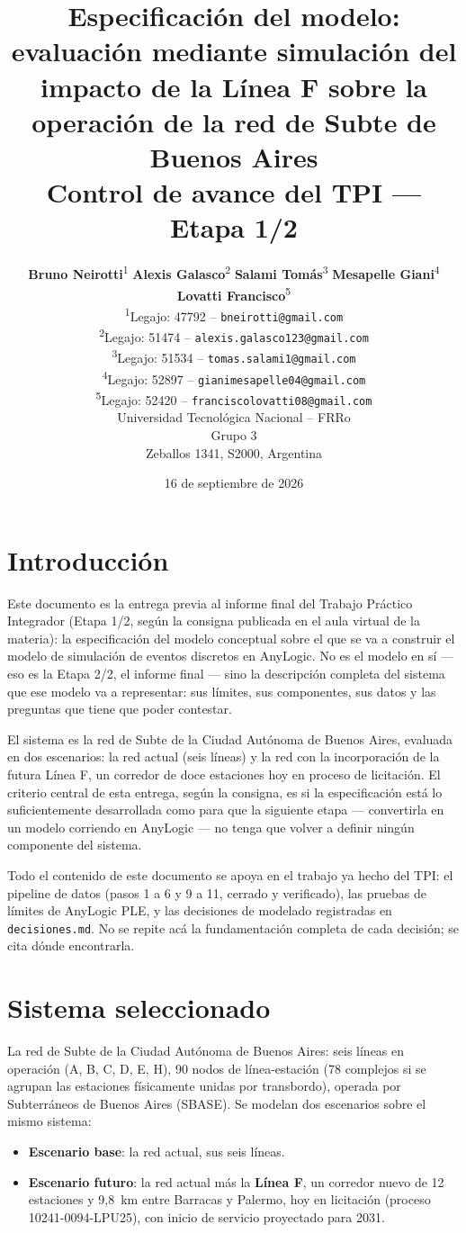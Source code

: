 \documentclass{article}
\title{Especificación del modelo: evaluación mediante simulación del impacto de la
Línea F sobre la operación de la red de Subte de Buenos Aires \\[0.3ex]
\large Control de avance del TPI --- Etapa 1/2}
\author{
  \textbf{Bruno Neirotti}\textsuperscript{1} \qquad \textbf{Alexis Galasco}\textsuperscript{2} \qquad \textbf{Salami Tomás}\textsuperscript{3} \qquad \textbf{Mesapelle Giani}\textsuperscript{4} \qquad \textbf{Lovatti Francisco}\textsuperscript{5} \\[0.5ex]
  \textsuperscript{1}Legajo: 47792 -- \texttt{bneirotti@gmail.com} \\
  \textsuperscript{2}Legajo: 51474 -- \texttt{alexis.galasco123@gmail.com} \\
  \textsuperscript{3}Legajo: 51534 -- \texttt{tomas.salami1@gmail.com} \\
  \textsuperscript{4}Legajo: 52897 -- \texttt{gianimesapelle04@gmail.com} \\
  \textsuperscript{5}Legajo: 52420 -- \texttt{franciscolovatti08@gmail.com} \\[0.5ex]
  Universidad Tecnológica Nacional -- FRRo \\
  Grupo 3 \\
  Zeballos 1341, S2000, Argentina \\
}
\date{16 de septiembre de 2026}
\begin{document}
\maketitle

\section{Introducción}

Este documento es la entrega previa al informe final del Trabajo Práctico Integrador
(Etapa 1/2, según la consigna publicada en el aula virtual de la materia): la
especificación del modelo conceptual sobre el que se va a construir el modelo de
simulación de eventos discretos en AnyLogic. No es el modelo en sí --- eso es la
Etapa 2/2, el informe final --- sino la descripción completa del sistema que ese
modelo va a representar: sus límites, sus componentes, sus datos y las preguntas que
tiene que poder contestar.

El sistema es la red de Subte de la Ciudad Autónoma de Buenos Aires, evaluada en dos
escenarios: la red actual (seis líneas) y la red con la incorporación de la futura
Línea F, un corredor de doce estaciones hoy en proceso de licitación. El criterio
central de esta entrega, según la consigna, es si la especificación está lo
suficientemente desarrollada como para que la siguiente etapa --- convertirla en un
modelo corriendo en AnyLogic --- no tenga que volver a definir ningún componente del
sistema.

Todo el contenido de este documento se apoya en el trabajo ya hecho del TPI: el
pipeline de datos (pasos 1 a 6 y 9 a 11, cerrado y verificado), las pruebas de
límites de AnyLogic PLE, y las decisiones de modelado registradas en
\texttt{decisiones.md}. No se repite acá la fundamentación completa de cada decisión;
se cita dónde encontrarla.

\section{Sistema seleccionado}

La red de Subte de la Ciudad Autónoma de Buenos Aires: seis líneas en operación (A,
B, C, D, E, H), 90 nodos de línea-estación (78 complejos si se agrupan las estaciones
físicamente unidas por transbordo), operada por Subterráneos de Buenos Aires (SBASE).
Se modelan dos escenarios sobre el mismo sistema:

\begin{itemize}
  \item \textbf{Escenario base}: la red actual, sus seis líneas.
  \item \textbf{Escenario futuro}: la red actual más la \textbf{Línea F}, un corredor
    nuevo de 12 estaciones y 9,8~km entre Barracas y Palermo, hoy en licitación
    (proceso 10241-0094-LPU25), con inicio de servicio proyectado para 2031.
\end{itemize}
\end{document}
